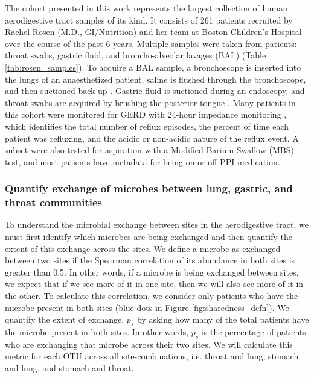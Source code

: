 \documentclass[12pt]{article}
\begin{document}
The cohort presented in this work represents the largest collection of 
human aerodigestive tract samples of its kind.
It consists of 261 patients recruited by Rachel Rosen 
(M.D., GI/Nutrition) and her team at Boston Children's Hospital  
over the course of the past 6 years. Multiple samples were 
taken from patients: throat swabs, gastric fluid, and broncho-alveolar lavages (BAL) (Table \ref{tab:rosen_samples}). 
To acquire a BAL sample, a bronchoscope is inserted into the lungs 
of an anaesthetized patient, saline is flushed through the 
bronchoscope, and then suctioned back up \cite{charslon-topographical-2011}. 
Gastric fluid is suctioned during an endoscopy, and throat
swabs are acquired by brushing the posterior tongue \cite{rosen-ppi-2015}. 
Many patients in this cohort were monitored for GERD with 24-hour
impedance monitoring \cite{vakil-gerd_defn-2006}, which identifies the total number of reflux episodes,
the percent of time each patient was refluxing, and the acidic or non-acidic
nature of the reflux event. A subset were also tested for aspiration with
a Modified Barium Swallow (MBS) test, and most patients have metadata for being on or off PPI medication.

\subsubsection{Quantify exchange of microbes between lung, gastric, and throat communities} \label{sec:exchange}

To understand the microbial exchange between sites in the 
aerodigestive tract, we must first identify which microbes are being exchanged
and then quantify the extent of this exchange across the sites. 
We define a microbe as exchanged between two sites if the Spearman 
correlation of its abundance in both sites is greater than 0.5.
In other words, if a microbe is being exchanged between sites, we expect that if we see 
more of it in one site, then we will also see more of it in the other. 
To calculate this correlation, we consider only patients who have the microbe present in both sites (blue dots in Figure \ref{fig:sharedness_defn}).
We quantify the extent of exchange, $p_s$ by asking how many of the total patients
have the microbe present in both sites. In other words, $p_s$ is the 
percentage of patients who are exchanging that microbe across their two sites.
We will calculate this metric for each OTU across all site-combinations, 
i.e. throat and lung, stomach and lung, and stomach and throat.
\end{document}
